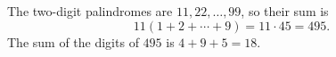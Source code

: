 The two-digit palindromes are $11,22,\dots,99$, so their sum is
\[11(1+2+\cdots+9)=11\cdot45=495 .\]
The sum of the digits of $495$ is $4+9+5=\boxed{18}$.
